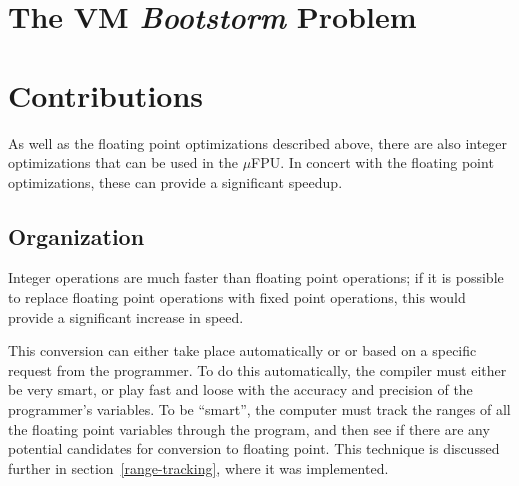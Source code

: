 \section{The VM {\em Bootstorm} Problem}\label{ch1:bootstorm}


%

%

\section{Contributions}

As well as the floating point optimizations described above, there are
also integer optimizations that can be used in the $\mu$FPU.  In concert
with the floating point optimizations, these can provide a significant
speedup.  

\subsection{Organization}

Integer operations are much faster than floating point operations; if it is
possible to replace floating point operations with fixed point operations,
this would provide a significant increase in speed.

This conversion can either take place automatically or or based on a
specific request from the programmer.  To do this automatically, the
compiler must either be very smart, or play fast and loose with the accuracy
and precision of the programmer's variables.  To be ``smart'', the computer
must track the ranges of all the floating point variables through the
program, and then see if there are any potential candidates for conversion
to floating point.  This technique is discussed further in
section~\ref{range-tracking}, where it was implemented.

